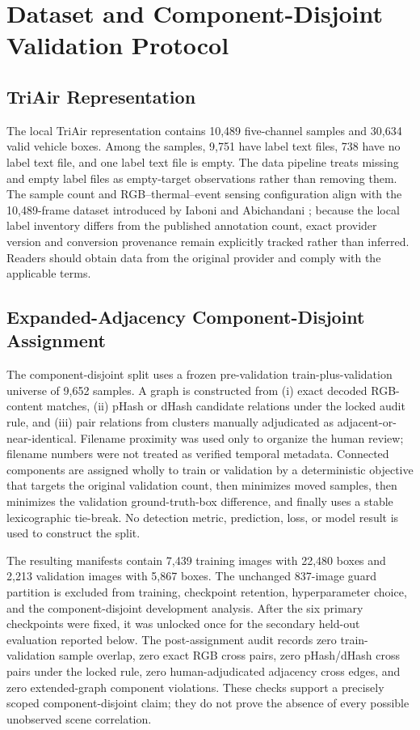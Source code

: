 
\section{Dataset and Component-Disjoint Validation Protocol}
\subsection{TriAir Representation}
The local TriAir representation contains 10,489 five-channel samples and 30,634 valid vehicle boxes. Among the samples, 9,751 have label text files, 738 have no label text file, and one label text file is empty. The data pipeline treats missing and empty label files as empty-target observations rather than removing them. The sample count and RGB--thermal--event sensing configuration align with the 10,489-frame dataset introduced by Iaboni and Abichandani \cite{iaboni2026trimodal}; because the local label inventory differs from the published annotation count, exact provider version and conversion provenance remain explicitly tracked rather than inferred. Readers should obtain data from the original provider and comply with the applicable terms.

\subsection{Expanded-Adjacency Component-Disjoint Assignment}
The component-disjoint split uses a frozen pre-validation train-plus-validation universe of 9,652 samples. A graph is constructed from (i) exact decoded RGB-content matches, (ii) pHash or dHash candidate relations under the locked audit rule, and (iii) pair relations from clusters manually adjudicated as adjacent-or-near-identical. Filename proximity was used only to organize the human review; filename numbers were not treated as verified temporal metadata. Connected components are assigned wholly to train or validation by a deterministic objective that targets the original validation count, then minimizes moved samples, then minimizes the validation ground-truth-box difference, and finally uses a stable lexicographic tie-break. No detection metric, prediction, loss, or model result is used to construct the split.

The resulting manifests contain 7,439 training images with 22,480 boxes and 2,213 validation images with 5,867 boxes. The unchanged 837-image guard partition is excluded from training, checkpoint retention, hyperparameter choice, and the component-disjoint development analysis. After the six primary checkpoints were fixed, it was unlocked once for the secondary held-out evaluation reported below. The post-assignment audit records zero train-validation sample overlap, zero exact RGB cross pairs, zero pHash/dHash cross pairs under the locked rule, zero human-adjudicated adjacency cross edges, and zero extended-graph component violations. These checks support a precisely scoped component-disjoint claim; they do not prove the absence of every possible unobserved scene correlation.

